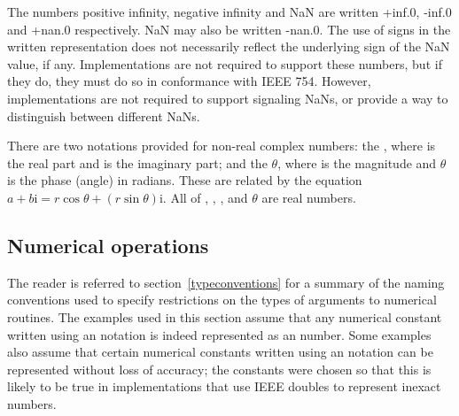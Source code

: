 The numbers positive infinity, negative infinity and NaN are written
{\cf +inf.0}, {\cf -inf.0} and {\cf +nan.0} respectively.
NaN may also be written {\cf -nan.0}.
The use of signs in the written representation does not necessarily
reflect the underlying sign of the NaN value, if any.
Implementations are not required to support these numbers, but if they do,
they must do so in conformance with IEEE 754.  However, implementations
are not required to support signaling NaNs, or provide a way to distinguish
between different NaNs.

There are two notations provided for non-real complex numbers:
the 
,
where  is the real part and  is the imaginary part;
and the 
$\theta$,
where  is the magnitude and $\theta$ is the phase (angle) in radians.
These are related by the equation
$a+b\mathrm{i} = r \cos\theta + (r \sin\theta) \mathrm{i}$.
All of , , , and $\theta$ are real numbers.


\subsection{Numerical operations}

The reader is referred to section~\ref{typeconventions} for a summary
of the naming conventions used to specify restrictions on the types of
arguments to numerical routines.
The examples used in this section assume that any numerical constant written
using an  notation is indeed represented as an 
number.  Some examples also assume that certain numerical constants written
using an  notation can be represented without loss of
accuracy; the  constants were chosen so that this is
likely to be true in implementations that use IEEE doubles to represent
inexact numbers.


